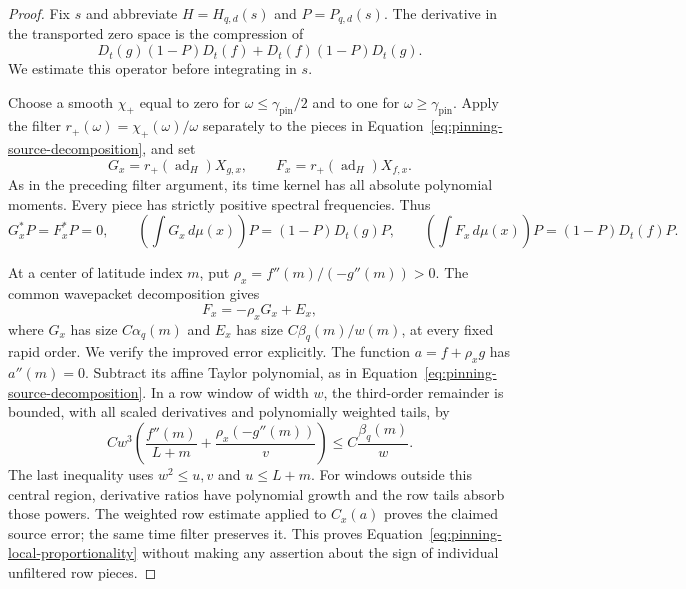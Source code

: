\begin{proof}
Fix $s$ and abbreviate $H=H_{q,d}(s)$ and $P=P_{q,d}(s)$.
The derivative in the transported zero space is the compression of
\begin{equation}
 D_t(g)(1-P)D_t(f)+D_t(f)(1-P)D_t(g).
 \label{eq:pinning-compressed-derivative}
\end{equation}
We estimate this operator before integrating in $s$.

Choose a smooth $\chi_+$ equal to zero for
$\omega\le\gamma_{\mathrm{pin}}/2$ and to one for
$\omega\ge\gamma_{\mathrm{pin}}$.  Apply the filter
$r_+(\omega)=\chi_+(\omega)/\omega$ separately to the pieces in
Equation~\eqref{eq:pinning-source-decomposition}, and set
\[
 G_x=r_+(\operatorname{ad}_H)X_{g,x},\qquad
 F_x=r_+(\operatorname{ad}_H)X_{f,x}.
\]
As in the preceding filter argument, its time kernel has all absolute
polynomial moments.  Every piece has strictly positive spectral
frequencies.  Thus
\begin{equation}
 G_x^*P=F_x^*P=0,
 \qquad
 \left(\int G_x\,d\mu(x)\right)P=(1-P)D_t(g)P,
 \qquad
 \left(\int F_x\,d\mu(x)\right)P=(1-P)D_t(f)P.
 \label{eq:pinning-raising}
\end{equation}

At a center of latitude index $m$, put
$\rho_x=f''(m)/(-g''(m))>0$.  The common wavepacket decomposition gives
\begin{equation}
 F_x=-\rho_xG_x+E_x,
 \label{eq:pinning-local-proportionality}
\end{equation}
where $G_x$ has size $C\alpha_q(m)$ and $E_x$ has size
$C\beta_q(m)/w(m)$, at every fixed rapid order.  We verify the improved
error explicitly.  The function $a=f+\rho_x g$ has $a''(m)=0$.
Subtract its affine Taylor polynomial, as in
Equation~\eqref{eq:pinning-source-decomposition}.  In a row window of
width $w$, the third-order remainder is bounded, with all scaled
derivatives and polynomially weighted tails, by
\[
 Cw^3\left(\frac{f''(m)}{L+m}+
             \frac{\rho_x(-g''(m))}{v}\right)
 \le C\frac{\beta_q(m)}{w}.
\]
The last inequality uses $w^2\le u,v$ and $u\le L+m$.
For windows outside this central region, derivative ratios have
polynomial growth and the row tails absorb those powers.  The weighted
row estimate applied to $C_x(a)$ proves the claimed source error; the
same time filter preserves it.  This proves
Equation~\eqref{eq:pinning-local-proportionality} without making any
assertion about the sign of individual unfiltered row pieces.


\end{proof}
